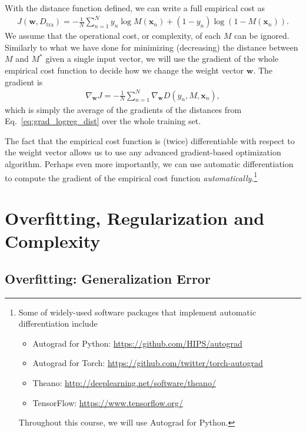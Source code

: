 \documentclass{report}
\newcommand{\vect}[1]{\mathbf{#1}}
\newcommand{\vx}[0]{\vect{x}}
\newcommand{\vw}[0]{\vect{w}}
\newcommand{\todo}[1]{{\Large\textcolor{red}{#1}}}
\begin{document}
With the distance function defined, we can write a full empirical cost as
\begin{align*}
    J(\vw, D_{\text{tra}}) = -\frac{1}{N} \sum_{n=1}^N 
    y_n \log M(\vx_n) + (1-y_n) \log (1- M(\vx_n)).
\end{align*}
We assume that the operational cost, or complexity, of each $M$ can be ignored. 
Similarly to what we have done for minimizing (decreasing) the distance between
$M$ and $M^*$ given a single input vector, we will use the gradient of the whole
empirical cost function to decide how we change the weight vector $\vw$. The
gradient is 
\begin{align*}
    \nabla_{\vw} J = -\frac{1}{N} \sum_{n=1}^N \nabla_{\vw} D(y_n, M, \vx_n),
\end{align*}
which is simply the average of the gradients of the distances from
Eq.~\eqref{eq:grad_logreg_dist} over the whole training set.

The fact that the empirical cost function is (twice) differentiable with respect
to the weight vector allows us to use any advanced gradient-based optimization
algorithm. Perhaps even more importantly, we can use automatic differentiation
to compute the gradient of the empirical cost function {\it
automatically}.\footnote{
    Some of widely-used software packages that implement automatic
    differentiation include
    \begin{itemize}
        \item Autograd for Python: \url{https://github.com/HIPS/autograd}
        \item Autograd for Torch:
            \url{https://github.com/twitter/torch-autograd}
        \item Theano: \url{http://deeplearning.net/software/theano/}
        \item TensorFlow: \url{https://www.tensorflow.org/}
    \end{itemize}
    Throughout this course, we will use Autograd for Python.
}


\todo{}

\todo{}

\section{Overfitting, Regularization and Complexity}

\subsection{Overfitting: Generalization Error}
\end{document}
